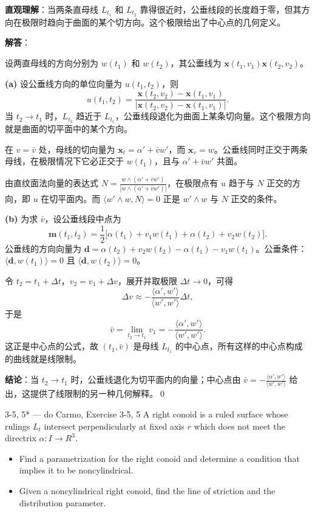 \begin{solution}
\textbf{直观理解}：当两条直母线 $L_{t_1}$ 和 $L_{t_2}$ 靠得很近时，公垂线段的长度趋于零，但其方向在极限时趋向于曲面的某个切方向。这个极限给出了中心点的几何定义。

\textbf{解答}：

设两直母线的方向分别为 $w(t_1)$ 和 $w(t_2)$，其公垂线为 $\mathbf{x}(t_1,v_1)\mathbf{x}(t_2,v_2)$。

\textbf{(a)} 设公垂线方向的单位向量为 $u(t_1,t_2)$，则
\[
u(t_1,t_2) = \frac{\mathbf{x}(t_2,v_2) - \mathbf{x}(t_1,v_1)}{|\mathbf{x}(t_2,v_2) - \mathbf{x}(t_1,v_1)|}.
\]
当 $t_2\to t_1$ 时，$L_{t_2}$ 趋近于 $L_{t_1}$，公垂线段退化为曲面上某条切向量。这个极限方向就是曲面的切平面中的某个方向。

在 $v=\bar{v}$ 处，母线的切向量为 $\mathbf{x}_t = \alpha' + \bar{v}w'$，而 $\mathbf{x}_v = w$。公垂线同时正交于两条母线，在极限情况下它必正交于 $w(t_1)$，且与 $\alpha'+\bar{v}w'$ 共面。

由直纹面法向量的表达式 $N = \frac{w\wedge(\alpha'+\bar{v}w')}{|w\wedge(\alpha'+\bar{v}w')|}$，在极限点有 $u$ 趋于与 $N$ 正交的方向，即 $u$ 在切平面内。而 $\langle w'\wedge w, N\rangle = 0$ 正是 $w'\wedge w$ 与 $N$ 正交的条件。

\textbf{(b)} 为求 $\bar{v}$，设公垂线段中点为
\[
\mathbf{m}(t_1,t_2) = \frac{1}{2}\big[\alpha(t_1)+v_1w(t_1) + \alpha(t_2)+v_2w(t_2)\big].
\]
公垂线的方向向量为 $\mathbf{d} = \alpha(t_2)+v_2w(t_2) - \alpha(t_1)-v_1w(t_1)$。公垂条件：$\langle \mathbf{d}, w(t_1)\rangle = 0$ 且 $\langle \mathbf{d}, w(t_2)\rangle = 0$。

令 $t_2 = t_1 + \Delta t$，$v_2 = v_1 + \Delta v$，展开并取极限 $\Delta t\to 0$，可得
\[
\Delta v \approx -\frac{\langle \alpha', w'\rangle}{\langle w', w'\rangle}\Delta t,
\]
于是
\[
\bar{v} = \lim_{t_2\to t_1} v_1 = -\frac{\langle \alpha', w'\rangle}{\langle w', w'\rangle}.
\]
这正是中心点的公式，故 $(t_1,\bar{v})$ 是母线 $L_{t_1}$ 的中心点，所有这样的中心点构成的曲线就是线限制。

\textbf{结论}：当 $t_2\to t_1$ 时，公垂线退化为切平面内的向量；中心点由 $\bar{v} = -\frac{\langle\alpha',w'\rangle}{\langle w',w'\rangle}$ 给出，这提供了线限制的另一种几何解释。\qed
\end{solution}

\begin{exercise}{3-5, 5* — do Carmo, Exercise 3-5, 5}
A right conoid is a ruled surface whose rulings $L_{t}$ intersect perpendicularly at fixed axis $r$ which does not meet the directrix $\alpha \colon I \to R^3$.
\begin{itemize}
\item[a.] Find a parametrization for the right conoid and determine a condition that implies it to be noncylindrical.
\item[b.] Given a noncylindrical right conoid, find the line of striction and the distribution parameter.
\end{itemize}
\end{exercise}

